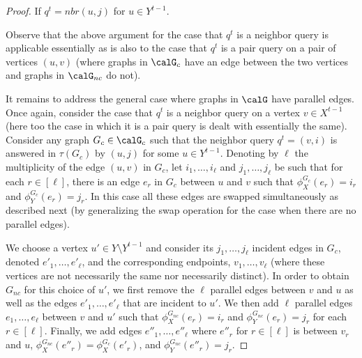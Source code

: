 \begin{proof}
If $q^t = nbr(u,j)$ for $u \in Y^{t-1}$.
 
 Observe that the above argument for the case that $q^t$ is a neighbor query is applicable essentially as is also to the case that $q^t$ is a pair query on a pair of vertices $(u,v)$ (where graphs in $\calG_c$ have an edge between the two vertices and graphs in $\calG_{nc}$ do not).

 
\iffalse
It remains to address the general  case where graphs in $\calG$ have parallel edges. Once again, consider the case that $q^t$ is a neighbor query on a vertex $v\in X^{t-1}$ (here too the case in which it is a pair query is dealt with essentially the same). Consider any graph $G_c \in \calG_c$ such that  the neighbor query $q^t = (v,i)$  is answered in $\tau(G_c)$ by $(u,j)$ for some $u \in Y^{t-1}$. Denoting by $\ell$ the multiplicity of the edge $(u,v)$ in $G_c$, let $i_1,\dots,i_\ell$ and $j_1,\dots,j_\ell$ be such that for each $r \in [\ell]$, there is an edge $e_r$ in $G_c$ between $u$ and $v$ such that $\phi^{G_c}_X(e_r)=i_r$ and $\phi^{G_c}_Y(e_r)=j_r$.
      In this case all these edges are swapped simultaneously as described next (by generalizing the swap operation for the case when there are no parallel edges).
 
 We choose a vertex $u'\in Y\setminus Y^{t-1}$  and consider its $j_1,\dots,j_\ell$ incident edges in $G_c$, denoted $e'_1,\dots,e'_\ell$, and the corresponding endpoints, 
$v_1, \ldots, v_{\ell}$ (where these vertices are not necessarily the same nor necessarily distinct). 
 In order to obtain $G_{nc}$ for this choice of $u'$, we first remove the $\ell$ parallel edges between $v$ and $u$ as well as the edges %
 $e'_1,\dots,e'_\ell$ that are incident to $u'$.
 We then  add $\ell$ parallel edges $e_1,\dots,e_\ell$ between $v$ and $u'$
 such that $\phi^{G_{nc}}_X(e_r)= i_r$ and $\phi^{G_{nc}}_Y(e_r)= j_r$ for each $r \in [\ell]$. Finally, we  add edges $e''_1,\dots,e''_\ell$ where $e''_r$ for $r\in [\ell]$ is between $v_{r}$ and $u$, $\phi^{G_{nc}}_X(e''_r) = \phi^{G_c}_X(e'_r)$, and $\phi^{G_{nc}}_Y(e''_r) = j_r$.



\end{proof}
